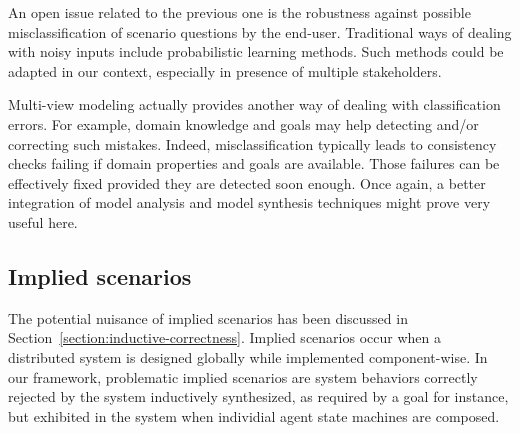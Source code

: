 An open issue related to the previous one is the robustness against possible misclassification of scenario questions by the end-user. Traditional ways of dealing with noisy inputs include probabilistic learning methods. Such methods could be adapted in our context, especially in presence of multiple stakeholders.

Multi-view modeling actually provides another way of dealing with classification errors. For example, domain knowledge and goals may help detecting and/or correcting such mistakes. Indeed, misclassification typically leads to consistency checks failing if domain properties and goals are available. Those failures can be effectively fixed provided they are detected soon enough. Once again, a better integration of model analysis and model synthesis techniques might prove very useful here.

\subsection*{Implied scenarios}

The potential nuisance of implied scenarios has been discussed in Section~\ref{section:inductive-correctness}. Implied scenarios occur when a distributed system is designed globally while implemented component-wise. In our framework, problematic implied scenarios are system behaviors correctly rejected by the system inductively synthesized, as required by a goal for instance, but exhibited in the system when individial agent state machines are composed.

